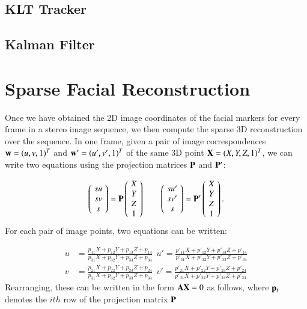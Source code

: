 \subsection{KLT Tracker}

\cite{Shi:1994}

\subsection{Kalman Filter}

\section{Sparse Facial Reconstruction}

Once we have obtained the 2D image coordinates of the facial markers for every frame in a stereo image sequence, we then compute the sparse 3D reconstruction over the sequence. In one frame, given a pair of image correspondences $\mathbf{w} = (u,v,1)^T$ and $\mathbf{w}' = (u',v',1)^T$ of the same 3D point $\mathbf{X} = (X,Y,Z,1)^T$, we can write two equations using the projection matrices $\mathbf{P}$ and $\mathbf{P'}$:

\begin{equation}
\left(\!
    \begin{array}{c}
      su \\
      sv \\
      s
    \end{array}
  	\!\right) = \vect{P}
  	\left(\!
    \begin{array}{c}
      X \\
      Y \\
      Z \\
      1
    \end{array}
  	\!\right) 
  	\ \ \ \ \ \ \ \ 
\left(\!
    \begin{array}{c}
      su' \\
      sv' \\
      s
    \end{array}
  	\!\right) = \vect{P'}
  	\left(\!
    \begin{array}{c}
      X \\
      Y \\
      Z \\
      1
    \end{array}
  	\!\right).
\end{equation}
For each pair of image points, two equations can be written:

\begin{align*}
u &= \frac{p_{11}X + p_{12}Y + p_{13}Z + p_{14}}{p_{31}X + p_{32}Y + p_{33}Z + p_{34}} \ \  
u' = \frac{p'_{11}X + p'_{12}Y + p'_{13}Z + p'_{14}}{p'_{31}X + p'_{32}Y + p'_{33}Z + p'_{34}}\\ 
v &= \frac{p_{21}X + p_{22}Y + p_{23}Z + p_{24}}{p_{31}X + p_{32}Y + p_{33}Z + p_{34}} \ \ 
v' = \frac{p'_{21}X + p'_{22}Y + p'_{23}Z + p'_{24}}{p'_{31}X + p'_{32}Y + p'_{33}Z + p'_{34}}
\end{align*}
Rearranging, these can be written in the form $\mathbf{AX} = 0$ as follows, where $\mathbf{p}_i$ denotes the $ith$ row of the projection matrix $\mathbf{P}$

